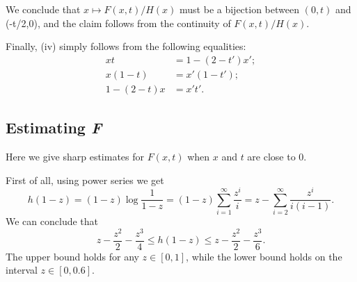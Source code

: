 \documentclass[12pt]{amsart}
\theoremstyle{definition}
\begin{document}
We conclude that $x \mapsto F(x,t)/H(x)$ must be a bijection between $(0,t)$ and (-t/2,0), and the claim follows from the continuity of $F(x,t)/H(x)$.

Finally, (iv) simply follows from the following equalities:
%
\begin{align*}
xt &=1-(2-t')x' ;\\
x(1-t) &=x'(1-t') ;\\
1-(2-t)x &= x't'.
\end{align*}
%


\subsection{Estimating \textit{F}} 
\label{sec:F_estimates}

Here we give sharp estimates for $F(x,t)$ when $x$ and $t$ are close to $0$.

First of all, using power series we get 
%
\[ h(1-z)=(1-z)\log \frac{1}{1-z} 
= (1-z) \sum_{i=1}^{\infty} \frac{z^i}{i} 
= z - \sum_{i=2}^{\infty} \frac{z^i}{i(i-1)} .\]
%
We can conclude that 
\[ z-\frac{z^2}{2}-\frac{z^3}{4} \leq h(1-z) \leq z-\frac{z^2}{2}-\frac{z^3}{6} .\]
The upper bound holds for any $z \in [0,1]$, while the lower bound holds on the interval $z \in [0,0.6]$.
\end{document}
